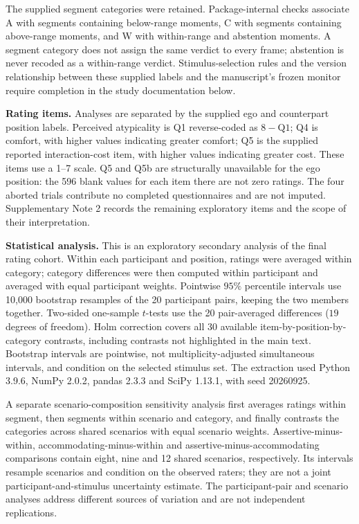 \documentclass[12pt,a4paper]{article}
\begin{document}
The supplied segment categories were retained. Package-internal checks associate A with segments
containing below-range moments, C with segments containing above-range moments, and W with
within-range and abstention moments. A segment category does not assign the same verdict to every
frame; abstention is never recoded as a within-range verdict. Stimulus-selection rules and the
version relationship between these supplied labels and the manuscript's frozen monitor require
completion in the study documentation below.

\noindent\textbf{Rating items.} Analyses are separated by the supplied ego and counterpart position
labels. Perceived atypicality is Q1 reverse-coded as $8-\mathrm{Q1}$; Q4 is comfort, with higher
values indicating greater comfort; Q5 is the supplied reported interaction-cost item, with higher
values indicating greater cost. These items use a 1--7 scale. Q5 and Q5b are structurally unavailable
for the ego position: the 596 blank values for each item there are not zero ratings. The four
aborted trials contribute no completed questionnaires and are not imputed. Supplementary
Note 2 records the remaining exploratory items and the scope of their interpretation.

\noindent\textbf{Statistical analysis.} This is an exploratory secondary analysis of the final
rating cohort. Within each participant and position, ratings were averaged within category; category
differences were then computed within participant and averaged with equal participant weights.
Pointwise $95\%$ percentile intervals use 10{,}000 bootstrap resamples of the 20 participant pairs,
keeping the two members together. Two-sided one-sample $t$-tests use the 20 pair-averaged differences
($19$ degrees of freedom). Holm correction covers all 30 available item-by-position-by-category
contrasts, including contrasts not highlighted in the main text. Bootstrap intervals are pointwise,
not multiplicity-adjusted simultaneous intervals, and condition on the selected stimulus set.
The extraction used Python 3.9.6, NumPy 2.0.2, pandas 2.3.3 and SciPy 1.13.1, with seed 20260925.

A separate scenario-composition sensitivity analysis first averages ratings within segment, then
segments within scenario and category, and finally contrasts the categories across shared scenarios
with equal scenario weights. Assertive-minus-within, accommodating-minus-within and
assertive-minus-accommodating comparisons contain eight, nine and 12 shared scenarios, respectively.
Its intervals resample scenarios and condition on the observed raters; they are not a joint
participant-and-stimulus uncertainty estimate. The participant-pair and scenario analyses address
different sources of variation and are not independent replications.
\end{document}
